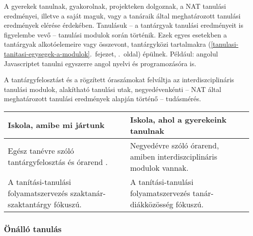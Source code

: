 A gyerekek tanulnak, gyakorolnak, projekteken dolgoznak, a NAT tanulási
eredményei, illetve a saját maguk, vagy a tanáraik által meghatározott
tanulási eredmények elérése érdekében. Tanulásuk -- a tantárgyak
tanulási eredményeit is figyelembe vevő -- tanulási modulok során
történik. Ezek egyes esetekben a tantárgyak alkotóelemeire vagy
összevont, tantárgyközi tartalmakra (\ref{tanulasi-tanitasi-egysegek-a-modulok}.~fejezet, \pageref{tanulasi-tanitasi-egysegek-a-modulok}.~oldal)
épülnek. Például: angolul Javascriptet tanulni egyszerre angol nyelvi és
programozásóra is.

A tantárgyfelosztást és a rögzített óraszámokat felváltja az
interdiszciplináris tanulási modulok, alakítható tanulási utak,
negyedévenkénti -- NAT által meghatározott tanulási eredmények alapján
történő -- tudásmérés.

\begin{longtable}[]{@{}ll@{}}
\toprule
\begin{minipage}[b]{0.47\columnwidth}\raggedright
Iskola, amibe mi jártunk\strut
\end{minipage} & \begin{minipage}[b]{0.47\columnwidth}\raggedright
Iskola, ahol a gyerekeink tanulnak\strut
\end{minipage}\tabularnewline
\midrule
\endhead
\begin{minipage}[t]{0.47\columnwidth}\raggedright
Egész tanévre szóló tantárgyfelosztás és órarend .\strut
\end{minipage} & \begin{minipage}[t]{0.47\columnwidth}\raggedright
Negyedévre szóló órarend, amiben interdiszciplináris modulok
vannak.\strut
\end{minipage}\tabularnewline
\begin{minipage}[t]{0.47\columnwidth}\raggedright
A tanítási-tanulási folyamatszervezés szaktanár-szaktantárgy
fókuszú.\strut
\end{minipage} & \begin{minipage}[t]{0.47\columnwidth}\raggedright
A tanítási-tanulási folyamatszervezés tanár-diákközösség fókuszú.\strut
\end{minipage}\tabularnewline
\bottomrule
\end{longtable}

\hypertarget{onallo-tanulas}{%
\subsubsection{Önálló tanulás}\label{onallo-tanulas}}

